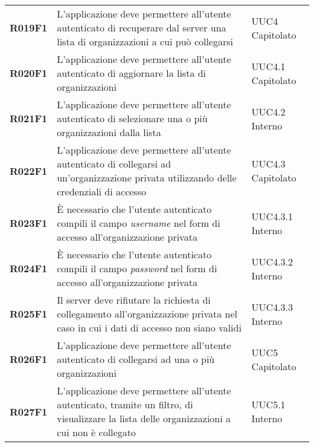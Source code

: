 \documentclass[../analisi-dei-requisiti.tex]{subfiles}
\begin{document}
\begin{longtable}[H]{>{\centering\bfseries}m{3cm} >{\centering}m{10cm} >{\centering\arraybackslash}m{3cm}}
  R019F1                               & L'applicazione deve permettere all'utente autenticato di recuperare dal server una lista di organizzazioni a cui può collegarsi                                                                         & UUC4 Capitolato               \\
  R020F1                               & L'applicazione deve permettere all'utente autenticato di aggiornare la lista di organizzazioni                                                                                                          & UUC4.1 Capitolato             \\
  R021F1                               & L'applicazione deve permettere all'utente autenticato di selezionare una o più organizzazioni dalla lista                                                                                               & UUC4.2 Interno                \\
  R022F1                               & L'applicazione deve permettere all'utente autenticato di collegarsi ad un'organizzazione privata utilizzando delle credenziali di accesso                                                               & UUC4.3 Capitolato             \\
  R023F1                               & È necessario che l'utente autenticato compili il campo \textit{username} nel form di accesso all'organizzazione privata                                                                                 & UUC4.3.1 Interno              \\
  R024F1                               & È necessario che l'utente autenticato compili il campo \textit{password} nel form di accesso all'organizzazione privata                                                                                 & UUC4.3.2 Interno              \\
  R025F1                               & Il server deve rifiutare la richiesta di collegamento all'organizzazione privata nel caso in cui i dati di accesso non siano validi                                                                     & UUC4.3.3 Interno              \\
  R026F1                               & L'applicazione deve permettere all'utente autenticato di collegarsi ad una o più organizzazioni                                                                                                         & UUC5 Capitolato               \\
  R027F1                               & L'applicazione deve permettere all'utente autenticato, tramite un filtro, di visualizzare la lista delle organizzazioni a cui non è collegato                                                           & UUC5.1 Interno                \\

\end{longtable}
\end{document}
